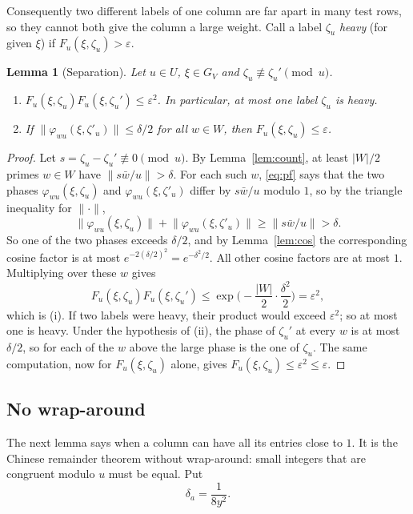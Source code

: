 \documentclass[11pt]{amsart}
\newtheorem{lemma}[theorem]{Lemma}
\theoremstyle{definition}
\theoremstyle{remark}
\newcommand{\nint}[1]{\lVert #1\rVert}
\begin{document}
Consequently two different labels of one column are far apart in many test rows, so they cannot both give the column a large weight. Call a label $\zeta_u$ \emph{heavy} (for given $\xi$) if $F_u(\xi,\zeta_u)>\varepsilon$.

\begin{lemma}[Separation]\label{lem:unique}
Let $u\in U$, $\xi\in G_V$ and $\zeta_u\not\equiv\zeta_u'\pmod u$.
\begin{enumerate}[label=(\roman*)]
\item $F_u(\xi,\zeta_u)F_u(\xi,\zeta_u')\le\varepsilon^2$. In particular, at most one label $\zeta_u$ is heavy.
\item If $\nint{\varphi_{wu}(\xi,\zeta'_u)}\le\delta/2$ for all $w\in W$, then $F_u(\xi,\zeta_u)\le\varepsilon$.
\end{enumerate}
\end{lemma}
\begin{proof}
Let $s=\zeta_u-\zeta_u'\not\equiv0\pmod u$. By Lemma~\ref{lem:count}, at least $|W|/2$ primes $w\in W$ have $\nint{s\bar w/u}>\delta$. For each such $w$, \eqref{eq:pf} says that the two phases $\varphi_{wu}(\xi,\zeta_u)$ and $\varphi_{wu}(\xi,\zeta'_u)$ differ by $s\bar w/u$ modulo $1$, so by the triangle inequality for $\nint{\cdot}$,
\[
 \nint{\varphi_{wu}(\xi,\zeta_u)}+\nint{\varphi_{wu}(\xi,\zeta'_u)}\ge\nint{s\bar w/u}>\delta .
\]
So one of the two phases exceeds $\delta/2$, and by Lemma~\ref{lem:cos} the corresponding cosine factor is at most $e^{-2(\delta/2)^2}=e^{-\delta^2/2}$. All other cosine factors are at most $1$. Multiplying over these $w$ gives
\[
 F_u(\xi,\zeta_u)F_u(\xi,\zeta_u')\le\exp\Big(-\frac{|W|}2\cdot\frac{\delta^2}2\Big)=\varepsilon^2,
\]
which is (i). If two labels were heavy, their product would exceed $\varepsilon^2$; so at most one is heavy. Under the hypothesis of (ii), the phase of $\zeta_u'$ at every $w$ is at most $\delta/2$, so for each of the $w$ above the large phase is the one of $\zeta_u$. The same computation, now for $F_u(\xi,\zeta_u)$ alone, gives $F_u(\xi,\zeta_u)\le\varepsilon^2\le\varepsilon$.
\end{proof}

\subsection{No wrap-around}
The next lemma says when a column can have all its entries close to $1$. It is the Chinese remainder theorem without wrap-around: small integers that are congruent modulo $u$ must be equal. Put
\[
 \delta_a=\frac1{8y^2}.
\]
\end{document}
